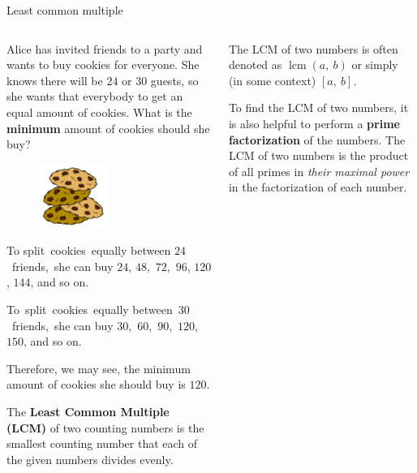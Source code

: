 \documentclass[9pt,aspectratio=169]{beamer}
\DeclareMathOperator{\lcm}{lcm}
\begin{document}
\begin{frame}{Least common multiple}
  \begin{columns}[T]
    \begin{column}{0.5\textwidth}
      \begin{problem}
        Alice has invited friends to a party and wants to buy cookies for everyone. She knows there will be $24$ or $30$ guests, so she wants that everybody to get an equal amount of cookies. What is the \textbf{minimum} amount of cookies should she buy?
      \end{problem}
      \begin{figure}
        \vspace*{-2em}\hspace*{-3em}
        \includegraphics[width=0.5\textwidth]{04 - Number Theory 101/coockies.png}
      \end{figure}

      To split~cookies~equally between $24$~friends,~she can buy $24$, $48$,~$72$,~$96$, $120$, $144$, and so on. 

      To~split~cookies~equally between~$30$~friends,~she can buy $30$,~$60$,~$90$,~$120$, $150$, and so on. 
      
      Therefore, we may see, the minimum amount of cookies she should buy is $120$.

      \begin{definition}
        The \textbf{Least Common Multiple (LCM)} of two counting numbers is the smallest counting number that each of the given numbers divides evenly.  
      \end{definition}
    \end{column}
    \begin{column}{0.5\textwidth}
      The LCM of two numbers is often denoted as $\lcm(a,\ b)$ or simply (in some context) $[a,\ b]$. 

      To find the LCM of two numbers, it is also helpful to perform a \textbf{prime factorization} of the numbers. The LCM of two numbers is the product of all primes in \emph{their maximal power} in the factorization of each number.
      

\end{column}
\end{columns}
\end{frame}
\end{document}
